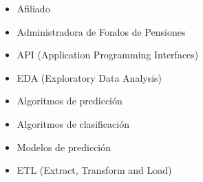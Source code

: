 \begin{singlespace}
    \begin{itemize}
        \item Afiliado
        \item Administradora de Fondos de Pensiones
        \item API (Application Programming Interfaces)
        \item EDA (Exploratory Data Analysis)
        \item Algoritmos de predicción
        \item Algoritmos de clasificación
        \item Modelos de predicción
        \item ETL (Extract, Transform and Load)
    \end{itemize}
\end{singlespace}